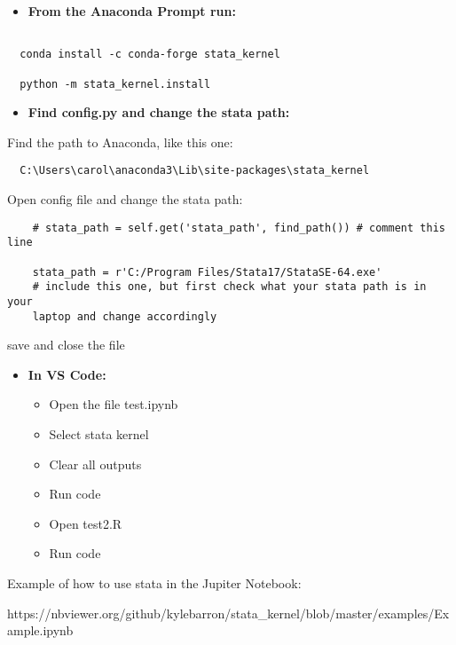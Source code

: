 \documentclass[12pt]{article}
\begin{document}
\begin{itemize}
  \item \textbf{From the Anaconda Prompt run:} 
\end{itemize}

\begin{verbatim}

  conda install -c conda-forge stata_kernel

  python -m stata_kernel.install

\end{verbatim}
  

\begin{itemize}
  \item \textbf{Find config.py and change the stata path:}
\end{itemize}

Find the path to Anaconda, like this one:

\begin{verbatim}
  C:\Users\carol\anaconda3\Lib\site-packages\stata_kernel
\end{verbatim}

  Open config file and change the stata path:

  \begin{verbatim}
    # stata_path = self.get('stata_path', find_path()) # comment this line 

    stata_path = r'C:/Program Files/Stata17/StataSE-64.exe' 
    # include this one, but first check what your stata path is in your 
    laptop and change accordingly

  \end{verbatim}
  
  save and close the file

  
  
\begin{itemize}  
  \item \textbf{In VS Code:} 
    \begin{itemize}
      \item Open the file test.ipynb
      \item Select stata kernel
      \item Clear all outputs
      \item Run code
    \end{itemize}
    \begin{itemize}
      \item Open test2.R 
      \item Run code
    \end{itemize}
\end{itemize}


Example of how to use stata in the Jupiter Notebook:

https://nbviewer.org/github/kylebarron/stata_kernel/blob/master/examples/Example.ipynb
\end{document}
